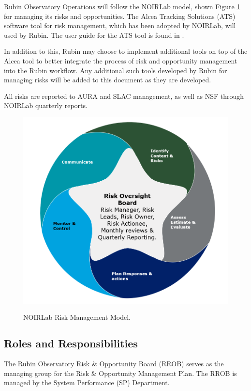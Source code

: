 Rubin Observatory Operations will follow the NOIRLab model, shown Figure \ref{fig:NOIRLab-risk-model} for managing its risks and opportunities. 
The Alcea Tracking Solutions (ATS) software tool for risk management, which has been adopted by NOIRLab, will used by Rubin.   
The user guide for the ATS  tool is found in .

In addition to this, Rubin may choose to implement additional tools on top of the Alcea tool to better integrate the process of risk and opportunity management into the Rubin workflow. 
Any additional such tools developed by Rubin for managing risks will be added to this document as they are developed. 
 
All risks are reported to AURA and SLAC management, as well as NSF through NOIRLab quarterly reports.

\begin{figure}[t]
\caption{NOIRLab Risk Management Model.}
\centering
\includegraphics[width=\textwidth]{NOIRLab-risk-model-temp}
\label{fig:NOIRLab-risk-model}
\end{figure}


\subsection{Roles and Responsibilities}

The Rubin Observatory Risk \& Opportunity Board (RROB) serves as the managing group for the Risk \& Opportunity Management Plan.
The RROB is managed by the System Performance (SP) Department.

